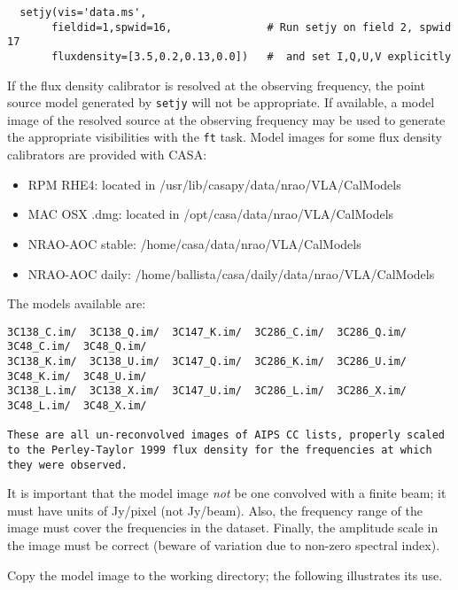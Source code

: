 \small
\begin{verbatim}
  setjy(vis='data.ms',
       fieldid=1,spwid=16,               # Run setjy on field 2, spwid 17
       fluxdensity=[3.5,0.2,0.13,0.0])   #  and set I,Q,U,V explicitly
\end{verbatim}
\normalsize

If the flux density calibrator is resolved at the observing frequency,
the point source model generated by {\tt setjy} will not be
appropriate.  If available, a model image of the resolved source at
the observing frequency may be used to generate the appropriate
visibilities with the {\tt ft} task. Model images for some flux
density calibrators are provided with CASA:

\begin{itemize}
   \item RPM RHE4: located in /usr/lib/casapy/data/nrao/VLA/CalModels
   \item MAC OSX .dmg: located in /opt/casa/data/nrao/VLA/CalModels
   \item NRAO-AOC stable: /home/casa/data/nrao/VLA/CalModels
   \item NRAO-AOC daily: /home/ballista/casa/daily/data/nrao/VLA/CalModels
\end{itemize}

The models available are:

\small
\begin{verbatim}
3C138_C.im/  3C138_Q.im/  3C147_K.im/  3C286_C.im/  3C286_Q.im/  3C48_C.im/  3C48_Q.im/ 
3C138_K.im/  3C138_U.im/  3C147_Q.im/  3C286_K.im/  3C286_U.im/  3C48_K.im/  3C48_U.im/
3C138_L.im/  3C138_X.im/  3C147_U.im/  3C286_L.im/  3C286_X.im/  3C48_L.im/  3C48_X.im/

These are all un-reconvolved images of AIPS CC lists, properly scaled
to the Perley-Taylor 1999 flux density for the frequencies at which 
they were observed.
\end{verbatim}
\normalsize


It is important that the model image {\em not} be one
convolved with a finite beam; it must have units of Jy/pixel (not
Jy/beam).  Also, the frequency range of the image must cover the
frequencies in the dataset.  Finally, the amplitude scale in the image
must be correct (beware of variation due to non-zero spectral index).

Copy the model image to the working directory; the following illustrates
its use.

